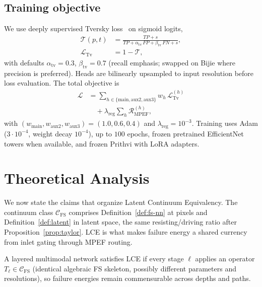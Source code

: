 \subsection{Training objective}
\label{sec:loss}
We use deeply supervised Tversky loss~\cite{salehi2017tversky} on sigmoid logits,
\begin{equation}
\label{eq:tversky}
\begin{split}
\mathcal{T}(p,t)
&=
\frac{TP+s}
{TP+\alpha_{\mathrm{tv}}\,FP
+\beta_{\mathrm{tv}}\,FN+s},\\
\mathcal{L}_{\mathrm{Tv}}&=1-\mathcal{T},
\end{split}
\end{equation}
with defaults \(\alpha_{\mathrm{tv}}=0.3\), \(\beta_{\mathrm{tv}}=0.7\) (recall emphasis; swapped on Bijie where precision is preferred). Heads are bilinearly upsampled to input resolution before loss evaluation. The total objective is
\begin{equation}
\label{eq:loss}
\begin{split}
\mathcal{L}
&=
\sum_{h\in\{\mathrm{main},\mathrm{aux2},\mathrm{aux3}\}}
w_h\,\mathcal{L}_{\mathrm{Tv}}^{(h)}\\
&\quad{}+
\lambda_{\mathrm{reg}}
\sum_{h}\mathcal{R}_{\mathrm{MPEF}}^{(h)},
\end{split}
\end{equation}
with \((w_{\mathrm{main}},w_{\mathrm{aux2}},w_{\mathrm{aux3}})=(1.0,0.6,0.4)\) and \(\lambda_{\mathrm{reg}}=10^{-3}\). Training uses Adam (\(3\cdot10^{-4}\), weight decay \(10^{-4}\)), up to \(100\) epochs, frozen pretrained EfficientNet towers when available, and frozen Prithvi with LoRA adapters.

\section{Theoretical Analysis}
\label{sec:theory}
We now state the claims that organize Latent Continuum Equivalency. The continuum class \(\mathcal{C}_{\mathrm{FS}}\) comprises Definition~\ref{def:fs-nn} at pixels and Definition~\ref{def:latent} in latent space, the same resisting/driving ratio after Proposition~\ref{prop:taylor}. LCE is what makes failure energy a shared currency from inlet gating through MPEF routing.

\begin{definition}
\label{def:lce}
A layered multimodal network satisfies LCE if every stage \(\ell\) applies an operator \(T_\ell\in\mathcal{C}_{\mathrm{FS}}\) (identical algebraic FS skeleton, possibly different parameters and resolutions), so failure energies remain commensurable across depths and paths.
\end{definition}


